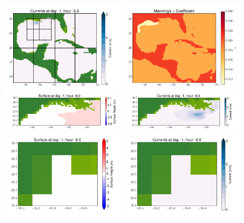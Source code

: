 \documentclass[11pt]{article}
\begin{document}
\includegraphics[width=0.475\textwidth]{frame0007fig2.png}
\vskip 10pt 
\includegraphics[width=0.475\textwidth]{frame0007fig3.png}
\includegraphics[width=0.475\textwidth]{frame0007fig4.png}
\vskip 10pt 
\includegraphics[width=0.475\textwidth]{frame0007fig5.png}
\includegraphics[width=0.475\textwidth]{frame0007fig6.png}
\vskip 10pt 
\includegraphics[width=0.475\textwidth]{frame0007fig7.png}
\end{document}
